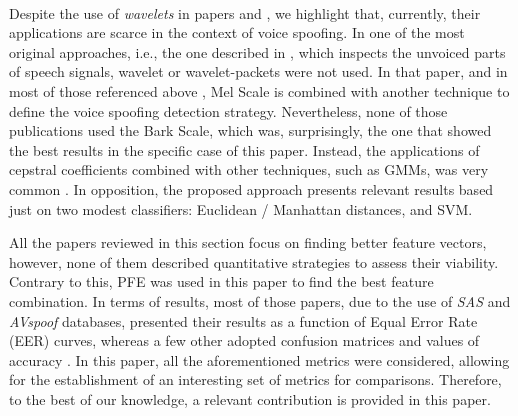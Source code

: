 \\
\par Despite the use of \textit{wavelets} in papers \cite{Patel2015} and \cite{7802552}, we highlight that, currently, their applications are scarce in the context of voice spoofing. In one of the most original approaches, i.e., the one described in \cite{ISI:000490497200068}, which inspects the unvoiced parts of speech signals, wavelet or wavelet-packets were not used. In that paper, and in most of those referenced above \cite{Hanilci2018} \cite{Patel2015} \cite{8396208} \cite{8725688} \cite{ISI:000490497200068}, Mel Scale is combined with another technique to define the voice spoofing detection strategy. Nevertheless, none of those publications used the Bark Scale, which was, surprisingly, the one that showed the best results in the specific case of this paper. Instead, the applications of cepstral coefficients combined with other techniques, such as GMMs, was very common \cite{alluri2019replay} \cite{7802552} \cite{8725688} \cite{Hanilci2018} \cite{TODISCO2017516} \cite{Patel2015} \cite{ISI:000392503100008}. In opposition, the proposed approach presents relevant results based just on two modest classifiers: Euclidean / Manhattan distances, and SVM.
\\
\par All the papers reviewed in this section focus on finding better feature vectors, however, none of them described quantitative strategies to assess their viability. Contrary to this, PFE was used in this paper to find the best feature combination. In terms of results, most of those papers, due to the use of \textit{SAS} \cite{SAS2015} \cite{SAS2017} \cite{SAS2019}  and \textit{AVspoof} \cite{AVspoof2015} databases, presented their results as a function of Equal Error Rate (EER) curves, whereas a few other adopted confusion matrices and  values of accuracy \cite{Ren2019} \cite{ISI:000473343500086} \cite{8396208}. In this paper, all the aforementioned metrics were considered, allowing for the establishment of an interesting set of metrics for comparisons. Therefore, to the best of our knowledge, a relevant contribution is provided in this paper. 
